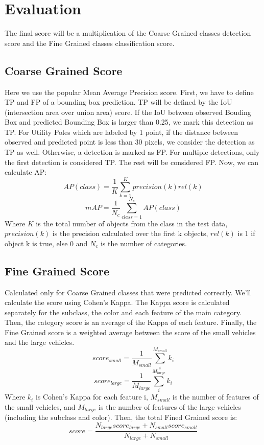 \documentclass[]{article}
\begin{document}
\section{Evaluation}
The final score will be a multiplication of the Coarse Grained classes detection score and the Fine Grained classes classification score.

\subsection{Coarse Grained Score}
Here we use the popular Mean Average Precision score. First, we have to define TP and FP of a bounding box prediction. TP will be defined by the IoU (intersection area over union area) score. If the IoU between observed Bouding Box and predicted Bounding Box is larger than 0.25, we mark this detection as TP. For Utility Poles which are labeled by 1 point, if the distance between observed and predicted point is less than 30 pixels, we consider the detection as TP as well. Otherwise, a detection is marked as FP. For multiple detections, only the first detection is considered TP. The rest will be considered FP. Now, we can calculate AP:\\
$$AP(class)=\frac{1}{K}\sum_{k=1}^{K}precision(k)rel(k)$$
$$mAP=\frac{1}{N_c}\sum_{class=1}^{N_c}AP(class)$$
Where $K$ is the total number of objects from the class in the test data, $precision(k)$ is the precision calculated over the first k objects, $rel(k)$ is 1 if object k is true, else 0 and $N_c$ is the number of categories.

\subsection{Fine Grained Score}
Calculated only for Coarse Grained classes that were predicted correctly. We'll calculate the score using Cohen's Kappa. The Kappa score is calculated separately for the subclass, the color and each feature of the main category. Then, the category score is an average of the Kappa of each feature. Finally, the Fine Grained score is a weighted average between the score of the small vehicles and the large vehicles.
$$score_{small}=\frac{1}{M_{small}}\sum_{i}^{M_{small}}k_i$$
$$score_{large}=\frac{1}{M_{large}}\sum_{i}^{M_{large}}k_i$$
Where $k_i$ is Cohen's Kappa for each feature i, $M_{small}$ is the number of features of the small vehicles, and $M_{large}$ is the number of features of the large vehicles (including the subclass and color).
Then, the total Fined Grained score is:
$$score=\frac{N_{large}score_{large}+N_{small}score_{small}}{N_{large}+N_{small}}$$
\end{document}
